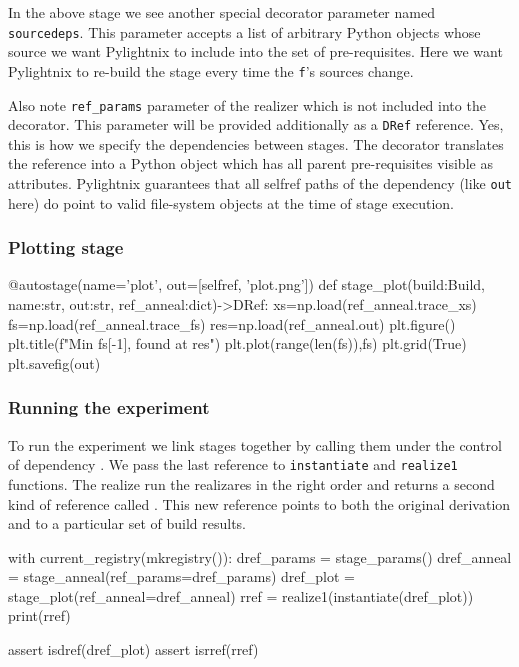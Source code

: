 In the above stage we see another special decorator parameter named
\texttt{sourcedeps}. This parameter accepts a list of arbitrary Python objects
whose source we want Pylightnix to include into the set of pre-requisites. Here
we want Pylightnix to re-build the stage every time the \texttt{f}'s sources
change.

Also note \texttt{ref\_params} parameter of the realizer which is not included
into the decorator. This parameter will be provided additionally as a
\texttt{DRef} reference. Yes, this is how we specify the dependencies between
stages. The decorator translates the reference into a Python object which has
all parent pre-requisites visible as attributes. Pylightnix guarantees that all
selfref paths of the dependency (like \texttt{out} here) do point to valid
file-system objects at the time of stage execution.

\subsubsection{Plotting stage}

\begin{pythontexcode}
@autostage(name='plot', out=[selfref, 'plot.png'])
def stage_plot(build:Build, name:str, out:str, ref_anneal:dict)->DRef:
  xs=np.load(ref_anneal.trace_xs)
  fs=np.load(ref_anneal.trace_fs)
  res=np.load(ref_anneal.out)
  plt.figure()
  plt.title(f"Min {fs[-1]}, found at {res}")
  plt.plot(range(len(fs)),fs)
  plt.grid(True)
  plt.savefig(out)
\end{pythontexcode}

\subsubsection{Running the experiment}

To run the experiment we link stages together by calling them under the control
of dependency .  We pass the last
reference to \texttt{instantiate} and \texttt{realize1} functions. The realize
run the realizares in the right order and returns a second kind of reference
called . This new reference
points to both the original derivation and to a particular set of build results.

\begin{pythontexcode}
with current_registry(mkregistry()):
  dref_params = stage_params()
  dref_anneal = stage_anneal(ref_params=dref_params)
  dref_plot = stage_plot(ref_anneal=dref_anneal)
  rref = realize1(instantiate(dref_plot))
  print(rref)

  assert isdref(dref_plot)
  assert isrref(rref)
\end{pythontexcode}

